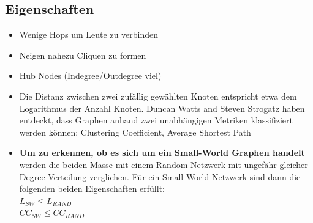 \documentclass[a4paper,landscape,12pt]{scrreprt}
\begin{document}
\begin{multicols*}{2}
\section{Eigenschaften} %
\label{sec:eigenschaften}
\begin{itemize}
	\item  Wenige Hops um Leute zu verbinden
	\item Neigen nahezu Cliquen zu formen
	 \item Hub Nodes (Indegree/Outdegree viel)
	 \item Die Distanz zwischen zwei zufällig gewählten Knoten entspricht etwa dem Logarithmus der Anzahl
Knoten. Duncan Watts and Steven Strogatz haben entdeckt, dass Graphen anhand zwei unabhängigen
Metriken klassifiziert werden können: Clustering Coefficient, Average Shortest Path
\item \textbf{ Um zu erkennen, ob es sich um ein Small-World Graphen handelt} werden die beiden Masse mit einem
Random-Netzwerk mit ungefähr gleicher Degree-Verteilung verglichen. Für ein Small World Netzwerk
sind dann die folgenden beiden Eigenschaften erfüllt:\\
$ L_{SW}  \le L_{RAND}$\\
$CC_{SW} \le CC_{RAND} $
\end{itemize}
\end{multicols*}
\end{document}
